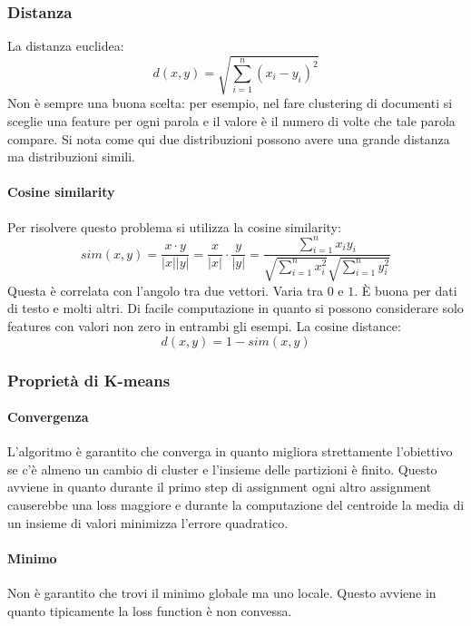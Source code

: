 		\subsubsection{Distanza}
		La distanza euclidea:
		$$d(x,y) = \sqrt{\sum\limits_{i=1}^n(x_i-y_i)^2}$$
		Non \`e sempre una buona scelta: per esempio, nel fare clustering di documenti si sceglie una feature per ogni parola e il valore \`e il numero di volte che tale parola compare.
		Si nota come qui due distribuzioni possono avere una grande distanza ma distribuzioni simili.
		
		\paragraph{Cosine similarity}
		Per risolvere questo problema si utilizza la cosine similarity:
		$$sim(x,y) = \frac{x\cdot y}{|x||y|} = \frac{x}{|x|}\cdot\frac{y}{|y|} = \frac{\sum\limits_{i = 1}^n x_iy_i}{\sqrt{\sum\limits_{i = 1}^n x_i^2}\sqrt{\sum\limits_{i = 1}^ny_i^2}}$$
		Questa \`e correlata con l'angolo tra due vettori.
		Varia tra $0$ e $1$.
		\`E buona per dati di testo e molti altri.
		Di facile computazione in quanto si possono considerare solo features con valori non zero in entrambi gli esempi.
		La cosine distance:
		$$d(x,y) = 1-sim(x,y)$$
		
		\subsubsection{Propriet\`a di K-means}
		
		\paragraph{Convergenza}
		L'algoritmo \`e garantito che converga in quanto migliora strettamente l'obiettivo se c'\`e almeno un cambio di cluster e l'insieme delle partizioni \`e finito.
		Questo avviene in quanto durante il primo step di assignment ogni altro assignment causerebbe una loss maggiore e durante la computazione del centroide la media di un insieme di valori minimizza l'errore quadratico.
		
		\paragraph{Minimo}
		Non \`e garantito che trovi il minimo globale ma uno locale.
		Questo avviene in quanto tipicamente la loss function \`e non convessa.
		
